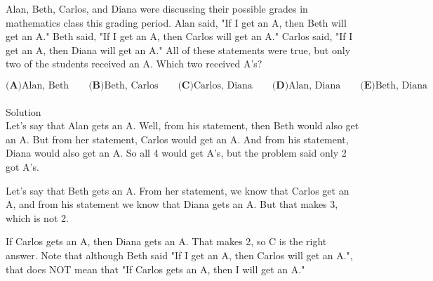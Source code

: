 

Alan, Beth, Carlos, and Diana were discussing their possible grades in mathematics class this grading period. Alan said, "If I get an A, then Beth will get an A." Beth said, "If I get an A, then Carlos will get an A." Carlos said, "If I get an A, then Diana will get an A." All of these statements were true, but only two of the students received an A. Which two received A's?

\[ \textbf{(A)} \text{Alan, Beth} \qquad
\textbf{(B)} \text{Beth, Carlos} \qquad
\textbf{(C)} \text{Carlos, Diana} \qquad
\textbf{(D)} \text{Alan, Diana} \qquad
\textbf{(E)} \text{Beth, Diana}
\]
\\
Solution
\\
Let's say that Alan gets an A. Well, from his statement, then Beth would also get an A. But from her statement, Carlos would get an A. And from his statement, Diana would also get an A. So all 4 would get A's, but the problem said only 2 got A's.

Let's say that Beth gets an A. From her statement, we know that Carlos get an A, and from his statement we know that Diana gets an A. But that makes 3, which is not 2.

If Carlos gets an A, then Diana gets an A. That makes 2, so $\boxed{\text{C}}$ is the right answer. Note that although Beth said "If I get an A, then Carlos will get an A.", that does NOT mean that "If Carlos gets an A, then I will get an A."